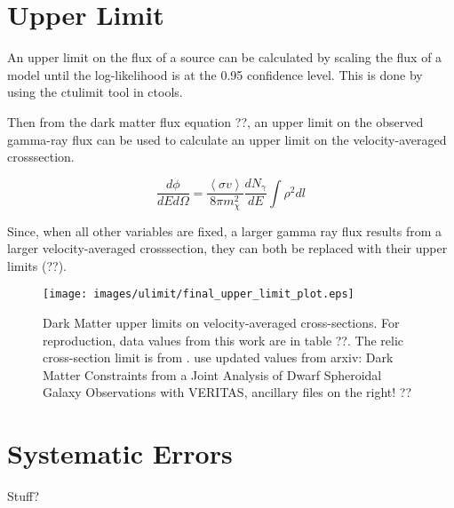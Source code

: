 \section{Upper Limit}
  An upper limit on the flux of a source can be calculated by scaling the flux of a model until the log-likelihood is at the 0.95 confidence level.
  This is done by using the ctulimit tool in ctools.
  
  Then from the dark matter flux {\color{red}equation ??}, an upper limit on the observed gamma-ray flux can be used to calculate an upper limit on the velocity-averaged crosssection.
  
  \begin{equation}\label{eqn:ulim}
    \frac{d\phi}{dE d\Omega} = \frac{ \left \langle \sigma v \right \rangle }{8\pi m_{\chi}^{2}} \frac{dN_{\gamma}}{dE} \int \rho^{2} dl
  \end{equation}
  
  Since, when all other variables are fixed, a larger gamma ray flux results from a larger velocity-averaged crosssection, they can both be replaced with their upper limits {\color{red}(??)}.

  \begin{figure}[ht]
    \centering
    \texttt{[image: images/ulimit/final\_upper\_limit\_plot.eps]}
    \caption[Dark Matter Upper Limit Plot]{
      Dark Matter upper limits on velocity-averaged cross-sections.
      For reproduction, data values from this work {\color{red}are in table ??}.
      The relic cross-section limit is from \cite{updatedWIMPRelicCrossSection}.
      {\color{red} use updated values from arxiv: Dark Matter Constraints from a Joint Analysis of Dwarf Spheroidal Galaxy Observations with VERITAS, ancillary files on the right! ??}
    }
    \label{fig:ulim}
  \end{figure}
  
\section{Systematic Errors}  

Stuff?


